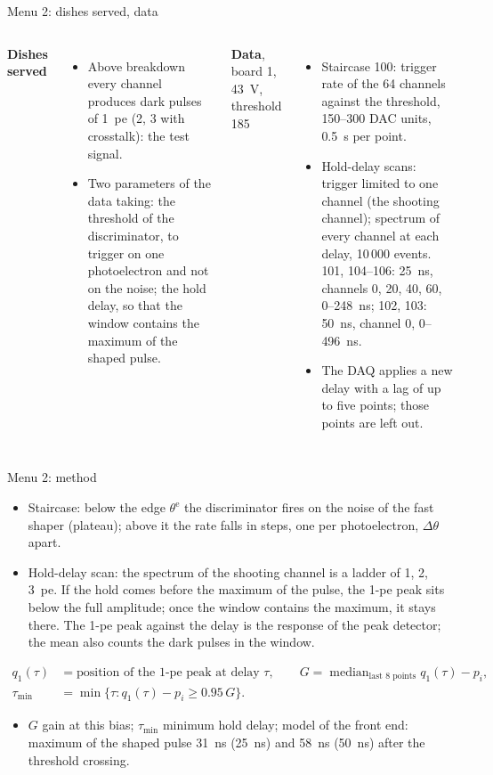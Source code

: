 \documentclass[10pt,aspectratio=169]{beamer}
\begin{document}
\begin{frame}{Menu 2: dishes served, data}
\begin{columns}
\textbf{Dishes served}
\begin{itemize}
\item Above breakdown every channel produces dark pulses of 1~pe (2, 3 with crosstalk): the
  test signal.
\item Two parameters of the data taking: the threshold of the discriminator, to trigger on one
  photoelectron and not on the noise; the hold delay, so that the window contains the maximum
  of the shaped pulse.
\end{itemize}
\textbf{Data}, board 1, 43~V, threshold 185
\begin{itemize}
\item Staircase 100: trigger rate of the 64 channels against the threshold, 150--300 DAC
  units, 0.5~s per point.
\item Hold-delay scans: trigger limited to one channel (the shooting channel); spectrum of
  every channel at each delay, 10\,000 events. 101, 104--106: 25~ns, channels 0, 20, 40, 60,
  0--248~ns; 102, 103: 50~ns, channel 0, 0--496~ns.
\item The DAQ applies a new delay with a lag of up to five points; those points are left out.
\end{itemize}
\end{columns}
\end{frame}

\begin{frame}{Menu 2: method}
\begin{itemize}
\item Staircase: below the edge $\theta^\mathrm{e}$ the discriminator fires on the noise of the
  fast shaper (plateau); above it the rate falls in steps, one per photoelectron, $\Delta\theta$
  apart.
\item Hold-delay scan: the spectrum of the shooting channel is a ladder of 1, 2, 3~pe. If the
  hold comes before the maximum of the pulse, the 1-pe peak sits below the full amplitude;
  once the window contains the maximum, it stays there. The 1-pe peak against the delay is
  the response of the peak detector; the mean also counts the dark pulses in the window.
\end{itemize}
\begin{align*}
q_1(\tau) &= \text{position of the 1-pe peak at delay } \tau, \qquad
G = \operatorname{median}_{\text{last 8 points}} q_1(\tau) - p_i, \\
\tau_\mathrm{min} &= \min\{\tau : q_1(\tau) - p_i \ge 0.95\,G\}.
\end{align*}
\begin{itemize}
\item $G$ gain at this bias; $\tau_\mathrm{min}$ minimum hold delay; model of the front end:
  maximum of the shaped pulse 31~ns (25~ns) and 58~ns (50~ns) after the threshold crossing.
\end{itemize}
\end{frame}
\end{document}
